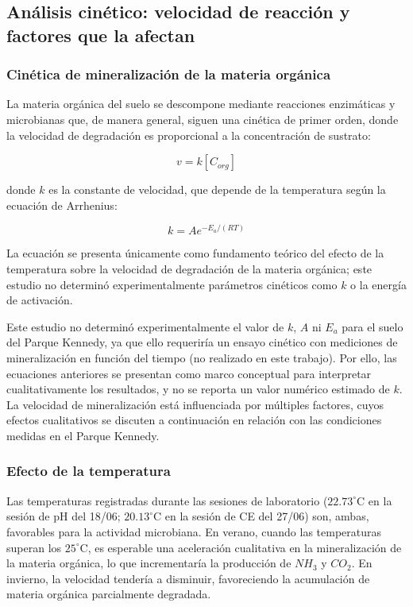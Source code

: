 \documentclass[fleqn]{jaes}
\begin{document}
\subsection{Análisis cinético: velocidad de reacción y factores que la afectan}

\subsubsection{Cinética de mineralización de la materia orgánica}

La materia orgánica del suelo se descompone mediante reacciones enzimáticas y microbianas que, de manera general, siguen una cinética de primer orden, donde la velocidad de degradación es proporcional a la concentración de sustrato:

\begin{equation}
v = k [C_{org}]
\label{eq:cinetica_orden1_repite}
\end{equation}

donde $k$ es la constante de velocidad, que depende de la temperatura según la ecuación de Arrhenius:

\begin{equation}
k = A e^{-E_a / (RT)}
\label{eq:arrhenius_repite}
\end{equation}

La ecuación se presenta únicamente como fundamento teórico del efecto de la temperatura sobre la velocidad de degradación de la materia orgánica; este estudio no determinó experimentalmente parámetros cinéticos como $k$ o la energía de activación.

Este estudio no determinó experimentalmente el valor de $k$, $A$ ni $E_a$ para el suelo del Parque Kennedy, ya que ello requeriría un ensayo cinético con mediciones de mineralización en función del tiempo (no realizado en este trabajo). Por ello, las ecuaciones anteriores se presentan como marco conceptual para interpretar cualitativamente los resultados, y no se reporta un valor numérico estimado de $k$. La velocidad de mineralización está influenciada por múltiples factores, cuyos efectos cualitativos se discuten a continuación en relación con las condiciones medidas en el Parque Kennedy.

\subsubsection{Efecto de la temperatura}

Las temperaturas registradas durante las sesiones de laboratorio ($22.73^\circ\text{C}$ en la sesión de pH del 18/06; $20.13^\circ\text{C}$ en la sesión de CE del 27/06) son, ambas, favorables para la actividad microbiana. En verano, cuando las temperaturas superan los $25^\circ\text{C}$, es esperable una aceleración cualitativa en la mineralización de la materia orgánica, lo que incrementaría la producción de $NH_3$ y $CO_2$. En invierno, la velocidad tendería a disminuir, favoreciendo la acumulación de materia orgánica parcialmente degradada.
\end{document}
